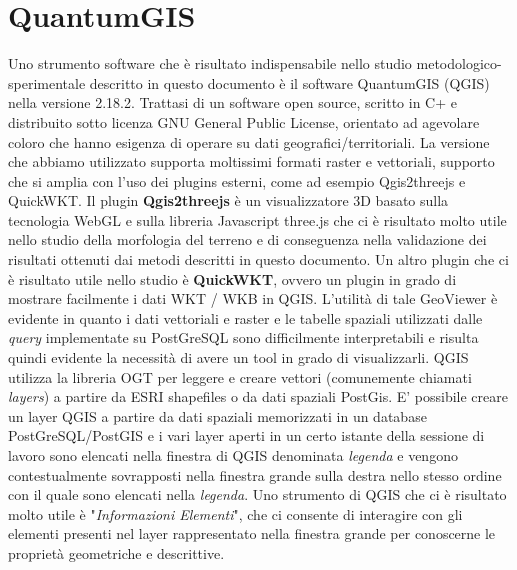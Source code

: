 \section{QuantumGIS}
Uno strumento software che è risultato indispensabile nello studio metodologico-sperimentale descritto in questo documento è il software QuantumGIS (QGIS) nella versione 2.18.2. Trattasi di un software open source, scritto in C+ e distribuito sotto licenza GNU General Public License, orientato ad agevolare coloro che hanno esigenza di operare su dati geografici/territoriali. La versione che abbiamo utilizzato supporta moltissimi formati raster e vettoriali, supporto che si amplia con l'uso dei plugins esterni, come ad esempio Qgis2threejs e QuickWKT. \newline
Il plugin \textbf{Qgis2threejs} è un visualizzatore 3D basato sulla tecnologia WebGL e sulla libreria Javascript three.js che ci è risultato molto utile nello studio della morfologia del terreno e di conseguenza nella validazione dei risultati ottenuti dai metodi descritti in questo documento. 
Un altro plugin che ci è risultato utile nello studio è \textbf{QuickWKT}, ovvero un plugin in grado di mostrare facilmente i dati WKT / WKB in QGIS. \newline
L'utilità di tale GeoViewer è evidente in quanto i dati vettoriali e raster e le tabelle spaziali utilizzati dalle \textit{query} implementate su PostGreSQL sono difficilmente interpretabili e risulta quindi evidente la necessità di avere un tool in grado di visualizzarli. QGIS utilizza la libreria OGT per leggere e creare vettori (comunemente chiamati \textit{layers}) a partire da ESRI shapefiles o da dati spaziali PostGis. E' possibile creare un layer QGIS a partire da dati spaziali memorizzati in un database PostGreSQL/PostGIS e i vari layer aperti in un certo istante della sessione di lavoro sono elencati nella finestra di QGIS denominata \textit{legenda} e vengono contestualmente sovrapposti nella finestra grande sulla destra nello stesso ordine con il quale sono elencati nella \textit{legenda}. Uno strumento di QGIS che ci è risultato molto utile è "\textit{Informazioni Elementi}", che ci consente di interagire con gli elementi presenti nel layer rappresentato nella finestra grande per conoscerne le proprietà geometriche e descrittive. 
